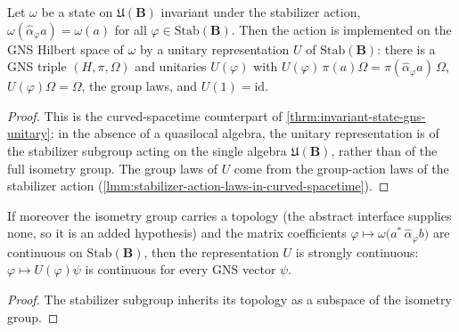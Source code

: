 \begin{theorem}
    \label{thrm:gns-unitary-stabilizer-in-curved-spacetime}
    \leanok
    Let $\omega$ be a state on $\mathfrak{U}(\mathbf{B})$ invariant under the stabilizer action, $\omega(\hat\alpha_\varphi a) = \omega(a)$ for all $\varphi \in \mathrm{Stab}(\mathbf{B})$. Then the action is implemented on the GNS Hilbert space of $\omega$ by a unitary representation $U$ of $\mathrm{Stab}(\mathbf{B})$: there is a GNS triple $(H, \pi, \Omega)$ and unitaries $U(\varphi)$ with $U(\varphi)\,\pi(a)\Omega = \pi(\hat\alpha_\varphi a)\,\Omega$, $U(\varphi)\Omega = \Omega$, the group laws, and $U(1) = \mathrm{id}$.
\end{theorem}
\begin{proof}
    \leanok
    This is the curved-spacetime counterpart of \ref{thrm:invariant-state-gns-unitary}: in the absence of a quasilocal algebra, the unitary representation is of the stabilizer subgroup acting on the single algebra $\mathfrak{U}(\mathbf{B})$, rather than of the full isometry group. The group laws of $U$ come from the group-action laws of the stabilizer action (\ref{lmm:stabilizer-action-laws-in-curved-spacetime}).
\end{proof}

\begin{theorem}
    \label{thrm:gns-unitary-stabilizer-strongly-continuous-in-curved-spacetime}
    \leanok
    If moreover the isometry group carries a topology (the abstract interface supplies none, so it is an added hypothesis) and the matrix coefficients $\varphi \mapsto \omega\big(a^*\,\hat\alpha_\varphi b\big)$ are continuous on $\mathrm{Stab}(\mathbf{B})$, then the representation $U$ is strongly continuous: $\varphi \mapsto U(\varphi)\psi$ is continuous for every GNS vector $\psi$.
\end{theorem}
\begin{proof}
    \leanok
    The stabilizer subgroup inherits its topology as a subspace of the isometry group.
\end{proof}

